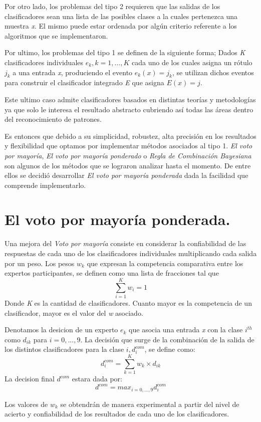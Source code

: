 Por otro lado, los problemas del tipo 2 requieren que las salidas de los clasificadores sean una lista de las posibles clases a la cuales pertenezca una muestra \textit{x}. El mismo puede estar ordenada por algún criterio referente a los algoritmos que se implementaron.

Por ultimo, los problemas del tipo 1 se definen de la siguiente forma; Dados \textit{K} clasificadores individuales $ e_{k}, k = 1,...,K $ cada uno de los cuales asigna un rótulo $ j_{k} $ a una entrada \textit{x}, produciendo el evento $ e_{k}(x) = j_{k} $, se utilizan dichos eventos para construir el clasificador integrado \textit{E} que asigna $ E(x) = j $. 

Este ultimo caso admite clasificadores basados en distintas teorías y metodologías ya que solo le interesa el resultado abstracto cubriendo así todas las áreas dentro del reconocimiento de patrones. 

Es entonces que debido a su simplicidad, robustez, alta precisión en los resultados y flexibilidad que optamos por implementar métodos asociados al tipo 1. \textit{El voto por mayoría}, \textit{El voto por mayoría ponderado} o \textit{Regla de Combinación Bayesiana} son algunos de los métodos que se lograron analizar hasta el momento. De entre ellos se decidió desarrollar \textit{El voto por mayoría ponderada} dada la facilidad que comprende implementarlo.

\section{El voto por mayoría ponderada.}
Una mejora del \textit{Voto por mayoría} consiste en considerar la confiabilidad de las respuestas de cada uno de los clasificadores individuales multiplicando cada salida por un peso. Los pesos $ w_{k} $ que expresan la competencia comparativa entre los expertos participantes, se definen como una lista de fracciones tal que
\[ \sum_{i=1}^{K}w_{i} = 1 \]
Donde \textit{K} es la cantidad de clasificadores. Cuanto mayor es la competencia de un clasificador, mayor es el valor del \textit{w} asociado.

Denotamos la desicion de un experto $ e_{k} $ que asocia una entrada \textit{x} con la clase $ i^{th} $ como $ d_{ik} $ para $ i = 0,...,9 $. La decisión que surge de la combinación de la salida de los distintos clasificadores para la clase $ i, d_{i}^{com} $, se define como:
\[ d_{i}^{com} = \sum_{k=1}^{K}w_{k} \times d_{ik} \]
La decision final $ d^{com} $ estara dada por:
\[ d^{com} = max_{i = 0,...,9} d_{i}^{com} \]

Los valores de $ w_{k} $ se obtendrán de manera experimental a partir del nivel de acierto y confiabilidad de los resultados de cada uno de los clasificadores.
